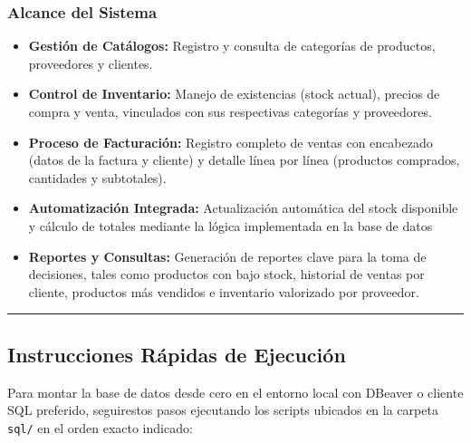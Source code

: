 \documentclass[
]{article}
\providecommand{\tightlist}{%
  \setlength{\itemsep}{0pt}\setlength{\parskip}{0pt}}
\begin{document}
\subsubsection{Alcance del Sistema}\label{alcance-del-sistema}

\begin{itemize}
\tightlist
\item
  \textbf{Gestión de Catálogos:} Registro y consulta de categorías de
  productos, proveedores y clientes.
\item
  \textbf{Control de Inventario:} Manejo de existencias (stock actual),
  precios de compra y venta, vinculados con sus respectivas categorías y
  proveedores.
\item
  \textbf{Proceso de Facturación:} Registro completo de ventas con
  encabezado (datos de la factura y cliente) y detalle línea por línea
  (productos comprados, cantidades y subtotales).
\item
  \textbf{Automatización Integrada:} Actualización automática del stock
  disponible y cálculo de totales mediante la lógica implementada en la
  base de datos
\item
  \textbf{Reportes y Consultas:} Generación de reportes clave para la
  toma de decisiones, tales como productos con bajo stock, historial de
  ventas por cliente, productos más vendidos e inventario valorizado por
  proveedor.
\end{itemize}

\begin{center}\rule{0.5\linewidth}{0.5pt}\end{center}

\subsection{Instrucciones Rápidas de
Ejecución}\label{instrucciones-ruxe1pidas-de-ejecuciuxf3n}

Para montar la base de datos desde cero en el entorno local con DBeaver
o cliente SQL preferido, seguirestos pasos ejecutando los scripts
ubicados en la carpeta \texttt{sql/} en el orden exacto indicado:
\end{document}
